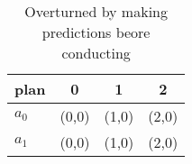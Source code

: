 \documentclass[a4paper]{article}
\begin{document}
\begin{table}
\begin{adjustbox}{width=0.6\columnwidth}
\begin{tabular}{|l|l|l|l|}
\hline
\textbf{plan} & \multicolumn{1}{c|}{\textbf{0}} & \multicolumn{1}{c|}{\textbf{1}} & \multicolumn{1}{c|}{\textbf{2}} \\ \hline
\textbf{$a_0$}  & (0,0) & (1,0) & (2,0) \\ \hline
\textbf{$a_1$}  & (0,0) & (1,0) & (2,0) \\ \hline
\end{tabular}
\end{adjustbox}
\caption{Overturned by making predictions beore conducting
}
\end{table}
\end{document}
